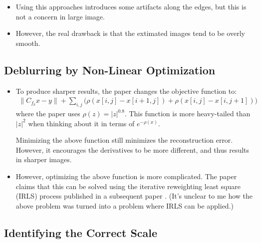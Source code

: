 \documentclass[10pt]{article}
\begin{document}
\begin{itemize}
  \item Using this approaches introduces some artifacts along the edges, but this is not a concern in large image.
  
  \item However, the real drawback is that the extimated images tend to be overly smooth.
  
\end{itemize}


\subsection{Deblurring by Non-Linear Optimization}

\begin{itemize}
  \item To produce sharper results, the paper changes the objective function to:
  \begin{align*}
    \| C_{f_k} x - y \| + \sum_{i,j} \Big( \rho(x[i,j] - x[i+1,j]) + \rho(x[i,j] - x[i,j+1]) \Big)
  \end{align*}
  where the paper uses $\rho(z) = |z|^{0.8}.$ This function is more heavy-tailed than $|z|^2$ when thinking about it in terms of $e^{-\rho(x)}.$
  
  Minimizing the above function still minimizes the reconstruction error. However, it encourages the derivatives to be more different, and thus results in sharper images.
  
  \item However, optimizing the above function is more complicated. The paper claims that this can be solved using the iterative reweighting least square (IRLS) process published in a subsequent paper \cite{levin-weiss}. (It's unclear to me how the above problem was turned into a problem where IRLS can be applied.)
\end{itemize}

\subsection{Identifying the Correct Scale}
\end{document}
